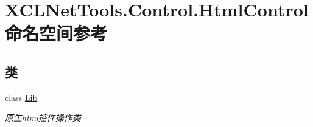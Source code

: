 \hypertarget{namespace_x_c_l_net_tools_1_1_control_1_1_html_control}{}\section{X\+C\+L\+Net\+Tools.\+Control.\+Html\+Control 命名空间参考}
\label{namespace_x_c_l_net_tools_1_1_control_1_1_html_control}
\subsection*{类}
\begin{DoxyCompactItemize}
\item 
class \hyperlink{class_x_c_l_net_tools_1_1_control_1_1_html_control_1_1_lib}{Lib}
\begin{DoxyCompactList}\small\item\em 原生html控件操作类 \end{DoxyCompactList}\end{DoxyCompactItemize}
